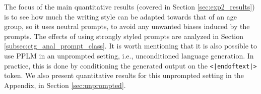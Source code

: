 The focus of the main quantitative results (covered in Section \ref{sec:exp2_results}) is to see how much the writing style can be adapted towards that of an age group, so it uses neutral prompts, to avoid any unwanted biases induced by the prompts. The effects of using strongly styled prompts are analyzed in Section \ref{subsec:ctg_anal_prompt_class}. It is worth mentioning that it is also possible to use PPLM in an unprompted setting, i.e., unconditioned language generation. In practice, this is done by conditioning the generated output on the \texttt{<|endoftext|>} token. We also present quantitative results for this unprompted setting in the Appendix, in Section \ref{sec:unprompted}.


